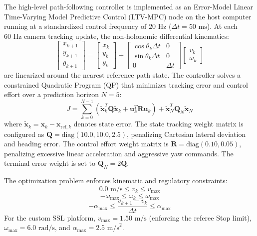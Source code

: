 \documentclass[a4paper,twoside,12pt]{report}
\begin{document}
The high-level path-following controller is implemented as an Error-Model Linear Time-Varying Model Predictive Control (LTV-MPC) node on the host computer running at a standardized control frequency of $20\text{ Hz}$ ($\Delta t = 50\text{ ms}$). At each $60\text{ Hz}$ camera tracking update, the non-holonomic differential kinematics:
\begin{equation}
\begin{bmatrix} x_{k+1} \\ y_{k+1} \\ \theta_{k+1} \end{bmatrix} = \begin{bmatrix} x_k \\ y_k \\ \theta_k \end{bmatrix} + \begin{bmatrix} \cos\theta_k \Delta t & 0 \\ \sin\theta_k \Delta t & 0 \\ 0 & \Delta t \end{bmatrix} \begin{bmatrix} v_k \\ \omega_k \end{bmatrix}
\label{eq:ltv_system}
\end{equation}
are linearized around the nearest reference path state. The controller solves a constrained Quadratic Program (QP) that minimizes tracking error and control effort over a prediction horizon $N = 5$:
\begin{equation}
J = \sum_{k=0}^{N-1} \left( \tilde{\mathbf{x}}_k^T \mathbf{Q} \tilde{\mathbf{x}}_k + \mathbf{u}_k^T \mathbf{R} \mathbf{u}_k \right) + \tilde{\mathbf{x}}_N^T \mathbf{Q}_N \tilde{\mathbf{x}}_N
\label{eq:mpc_cost}
\end{equation}
where $\tilde{\mathbf{x}}_k = \mathbf{x}_k - \mathbf{x}_{\text{ref}, k}$ denotes state error. The state tracking weight matrix is configured as $\mathbf{Q} = \text{diag}(10.0, 10.0, 2.5)$, penalizing Cartesian lateral deviation and heading error. The control effort weight matrix is $\mathbf{R} = \text{diag}(0.10, 0.05)$, penalizing excessive linear acceleration and aggressive yaw commands. The terminal error weight is set to $\mathbf{Q}_N = 2\mathbf{Q}$.

The optimization problem enforces kinematic and regulatory constraints:
\begin{equation}
0.0\text{ m/s} \le v_k \le v_{\text{max}}
\label{eq:velocity_constraint}
\end{equation}
\begin{equation}
-\omega_{\text{max}} \le \omega_k \le \omega_{\text{max}}
\label{eq:omega_constraint}
\end{equation}
\begin{equation}
-\alpha_{\text{max}} \le \frac{v_{k+1} - v_k}{\Delta t} \le \alpha_{\text{max}}
\label{eq:acceleration_constraint}
\end{equation}
For the custom SSL platform, $v_{\text{max}} = 1.50\text{ m/s}$ (enforcing the referee Stop limit), $\omega_{\text{max}} = 6.0\text{ rad/s}$, and $\alpha_{\text{max}} = 2.5\text{ m/s}^2$. 
\end{document}
